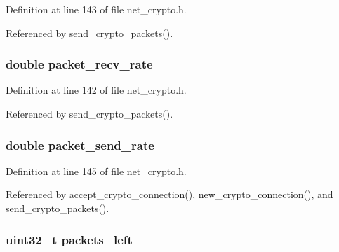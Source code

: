 Definition at line 143 of file net\+\_\+crypto.\+h.



Referenced by send\+\_\+crypto\+\_\+packets().

\hypertarget{struct_crypto___connection_ae1c1fa0c995f0fab590b094baa769e8d}{
\subsubsection[{packet\+\_\+recv\+\_\+rate}]{\setlength{\rightskip}{0pt plus 5cm}double packet\+\_\+recv\+\_\+rate}}\label{struct_crypto___connection_ae1c1fa0c995f0fab590b094baa769e8d}


Definition at line 142 of file net\+\_\+crypto.\+h.



Referenced by send\+\_\+crypto\+\_\+packets().

\hypertarget{struct_crypto___connection_a8358768a02871910ed059b1b2646438e}{
\subsubsection[{packet\+\_\+send\+\_\+rate}]{\setlength{\rightskip}{0pt plus 5cm}double packet\+\_\+send\+\_\+rate}}\label{struct_crypto___connection_a8358768a02871910ed059b1b2646438e}


Definition at line 145 of file net\+\_\+crypto.\+h.



Referenced by accept\+\_\+crypto\+\_\+connection(), new\+\_\+crypto\+\_\+connection(), and send\+\_\+crypto\+\_\+packets().

\hypertarget{struct_crypto___connection_adfabcbe80305cc6b4e1c0dfef5c48653}{
\subsubsection[{packets\+\_\+left}]{\setlength{\rightskip}{0pt plus 5cm}uint32\+\_\+t packets\+\_\+left}}\label{struct_crypto___connection_adfabcbe80305cc6b4e1c0dfef5c48653}


